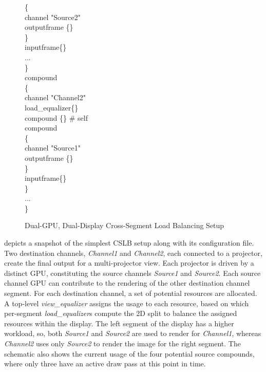\begin{figure}[h!t]
{\begin{minipage}[b]{0.46\textwidth}
{\quad \quad \{ \\
\quad \quad \quad channel "Source2" \\
\quad \quad \quad outputframe \{\} \\
\quad \quad \} \\
\quad \quad inputframe\{\} \\
\quad \quad ... \\
\quad \} \\
\quad compound \\
\quad \{ \\
\quad \quad channel "Channel2" \\
\quad \quad load\_equalizer\{\} \\
\quad \quad compound \{\} \# self \\
\quad \quad compound \\
\quad \quad \{  \\
\quad \quad \quad channel "Source1"  \\
\quad \quad \quad outputframe \{\}  \\
\quad \quad \} \\
\quad \quad inputframe\{\} \\
\quad \} \\
\quad ... \\
\} \\
	\label{fViewEqualizerConfig}}
	\end{minipage}
   }
\caption{Dual-GPU, Dual-Display Cross-Segment Load Balancing Setup}
\label{fViewEqualizer}
\end{figure}

 depicts a snapshot of the simplest CSLB setup along with
its configuration file. Two destination channels, {\em Channel1} and {\em
Channel2}, each connected to a projector, create the final output for a
multi-projector view. Each projector is driven by a distinct GPU, constituting
the source channels {\em Source1} and {\em Source2}. Each source channel GPU
can contribute to the rendering of the other destination channel segment. For
each destination channel, a set of potential resources are allocated. A
top-level {\em view\_equalizer} assigns the usage to each resource, based on
which per-segment {\em load\_equalizer}s compute the 2D split to balance the
assigned resources within the display. The left segment of the display has a
higher workload, so, both {\em Source1} and {\em Source2} are used to render
for {\em Channel1}, whereas {\em Channel2} uses only {\em Source2} to render
the image for the right segment. The schematic also shows the current usage of
the four potential source compounds, where only three have an active draw pass
at this point in time.

